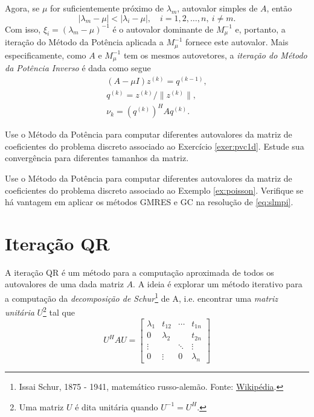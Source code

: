 Agora, se $\mu$ for suficientemente próximo de $\lambda_m$, autovalor simples de $A$, então
\begin{equation}
  |\lambda_m-\mu| < |\lambda_i-\mu|,\quad i=1,2,\dotsc,n,~i\neq m.
\end{equation}
Com isso, $\xi_i=(\lambda_m-\mu)^{-1}$ é o autovalor dominante de $M_\mu^{-1}$ e, portanto, a iteração do Método da Potência aplicada a $M_\mu^{-1}$ fornece este autovalor. Mais especificamente, como $A$ e $M_\mu^{-1}$ tem os  mesmos autovetores, a \emph{iteração do Método da Potência Inverso} é dada como segue
\begin{gather}
  (A-\mu I)z^{(k)} = q^{(k-1)}, \label{eq:slmpi}\\
  q^{(k)}=z^{(k)}/\|z^{(k)}\|,\\
  \nu_k = (q^{(k)})^H A q^{(k)}.
\end{gather}


\begin{exer}
  Use o Método da Potência para computar diferentes autovalores da matriz de coeficientes do problema discreto associado ao Exercício \ref{exer:pvc1d}. Estude sua convergência para diferentes tamanhos da matriz. 
\end{exer}

\begin{exer}
  Use o Método da Potência para computar diferentes autovalores da matriz de coeficientes do problema discreto associado ao Exemplo \ref{ex:poisson}. Verifique se há vantagem em aplicar os métodos GMRES e GC na resolução de \eqref{eq:slmpi}.
\end{exer}

\section{Iteração QR}\label{cap_autoval_sec_qr}

A iteração QR é um método para a computação aproximada de todos os autovalores de uma dada matriz $A$. A ideia é explorar um método iterativo para a computação da \emph{decomposição de Schur}\footnote{Issai Schur, 1875 - 1941, matemático russo-alemão. Fonte: \href{https://pt.wikipedia.org/wiki/Issai_Schur}{Wikipédia}.} de A, i.e. encontrar uma \emph{matriz unitária} $U$\footnote{Uma matriz $U$ é dita unitária quando $U^{-1} = U^H$.} tal que
\begin{equation}
  U^{H}AU =
  \begin{bmatrix}
    \lambda_1 & t_{12} & \cdots & t_{1n}\\
    0 & \lambda_2 & & t_{2n}\\
    \vdots & & \ddots & \vdots\\
    0 & \vdots & 0 & \lambda_n
  \end{bmatrix}
\end{equation}


